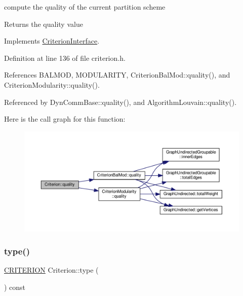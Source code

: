 compute the quality of the current partition scheme

\begin{DoxyReturn}{Returns}
the quality value 
\end{DoxyReturn}


Implements \hyperlink{classCriterionInterface_a5d287dc7755f7ce7d6a3d91f0d8fa5de}{Criterion\+Interface}.



Definition at line 136 of file criterion.\+h.



References B\+A\+L\+M\+OD, M\+O\+D\+U\+L\+A\+R\+I\+TY, Criterion\+Bal\+Mod\+::quality(), and Criterion\+Modularity\+::quality().



Referenced by Dyn\+Comm\+Base\+::quality(), and Algorithm\+Louvain\+::quality().

Here is the call graph for this function\+:
\nopagebreak
\begin{figure}[H]
\begin{center}
\leavevmode
\includegraphics[width=350pt]{classCriterion_a1f8b3a7bf56b5434b04d5366d754d459_cgraph}
\end{center}
\end{figure}
\mbox{\label{classCriterion_a023f88034d2712af46160f1842388b0d}} 
\subsubsection{\texorpdfstring{type()}{type()}}
{\footnotesize\ttfamily \hyperlink{classCriterion_a55594c223ce0837b8319c46c66cb648f}{C\+R\+I\+T\+E\+R\+I\+ON} Criterion\+::type (\begin{DoxyParamCaption}{ }\end{DoxyParamCaption}) const\hspace{0.3cm}{\ttfamily [inline]}}

